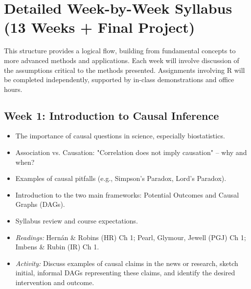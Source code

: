 \documentclass[10.5pt]{article}
\begin{document}
\section{Detailed Week-by-Week Syllabus (13 Weeks + Final Project)}
This structure provides a logical flow, building from fundamental concepts to more advanced methods and applications. Each week will involve discussion of the assumptions critical to the methods presented. Assignments involving R will be completed independently, supported by in-class demonstrations and office hours.

\subsection*{Week 1: Introduction to Causal Inference}
\begin{itemize}
    \item The importance of causal questions in science, especially biostatistics.
    \item Association vs. Causation: "Correlation does not imply causation" – why and when?
    \item Examples of causal pitfalls (e.g., Simpson's Paradox, Lord's Paradox).
    \item Introduction to the two main frameworks: Potential Outcomes and Causal Graphs (DAGs).
    \item Syllabus review and course expectations.
    \item \textit{Readings:} Hernán \& Robins (HR) Ch 1; Pearl, Glymour, Jewell (PGJ) Ch 1; Imbens \& Rubin (IR) Ch 1.
    \item \textit{Activity:} Discuss examples of causal claims in the news or research, sketch initial, informal DAGs representing these claims, and identify the desired intervention and outcome.
\end{itemize}
\end{document}
